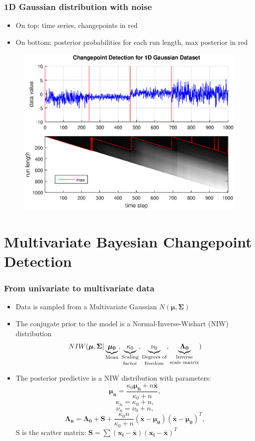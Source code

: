 \documentclass{beamer} %
\begin{document}
\begin{frame}
\frametitle{1D Gaussian distribution with noise}
\begin{itemize}
\item On top: time series, changepoints in red
\item On bottom: posterior probabilities for each run length, max posterior in red
\end{itemize}
\begin{figure}
\centering
\includegraphics[width=.7\linewidth]{1d_gauss.eps}
\end{figure}
\end{frame}


\section{Multivariate Bayesian Changepoint Detection}


\begin{frame}
\frametitle{From univariate to multivariate data}
\begin{itemize}
\item Data is sampled from a Multivariate Gaussian $N(\boldsymbol{\mu}, \boldsymbol{\Sigma})$
\item The conjugate prior to the model is a Normal-Inverse-Wishart (NIW) distribution \[NIW(\boldsymbol{\mu}, \boldsymbol{\Sigma} | \underbrace{\boldsymbol{\mu_0}}_{\text{Mean}}, \underbrace{\kappa_0}_{\text{\shortstack{Scaling \\ factor}}}, \underbrace{\nu_0}_{\text{\shortstack{Degrees of \\ freedom}}}, \underbrace{\boldsymbol{\Lambda_0}}_{\text{\shortstack{Inverse \\ scale matrix}}})\]
\item The posterior predictive is a NIW distribution with parameters:
\[\boldsymbol{\mu_n} = \frac{\kappa_0\boldsymbol{\mu_0} + n\boldsymbol{\bar{x}}}{\kappa_0 + n}, \]
\[\kappa_n = \kappa_0 + n,\]
\[\nu_n = \nu_0 + n,\]
\[\boldsymbol{\Lambda_n} = \boldsymbol{\Lambda_0} + \boldsymbol{S} + \frac{\kappa_0n}{\kappa_0 + n}(\boldsymbol{\bar{x}} - \boldsymbol{\mu_0})(\boldsymbol{\bar{x}} - \boldsymbol{\mu_0})^T, \]
\centering S is the scatter matrix: \(\boldsymbol{S} = \sum(\boldsymbol{x_i} - \boldsymbol{\bar{x}})(\boldsymbol{x_i} - \boldsymbol{\bar{x}})^T\)
\end{itemize}
\end{frame}
\end{document}
